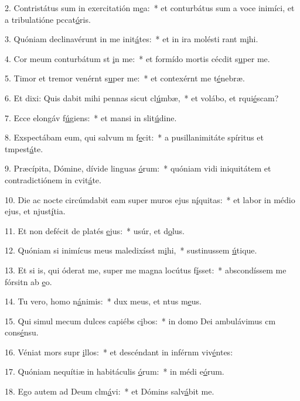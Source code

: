 2. Contristátus sum in exercitatión m\uline{e}a:~* et conturbátus sum a voce inimíci, et a tribulatióne pccat\uline{ó}ris.\par 
3. Quóniam declinavérunt in me init\uline{á}tes:~* et in ira molésti rant m\uline{i}hi.\par 
4. Cor meum conturbátum st \uline{i}n me:~* et formído mortis cécdit s\uline{u}per me.\par 
5. Timor et tremor venérnt s\uline{u}per me:~* et contexérnt me t\uline{é}nebræ.\par 
6. Et dixi: Quis dabit mihi pennas sicut cl\uline{ú}mbæ,~* et volábo, et rqui\uline{é}scam?\par 
7. Ecce elongáv f\uline{ú}giens:~* et mansi in slit\uline{ú}dine.\par 
8. Exspectábam eum, qui salvum m f\uline{e}cit:~* a pusillanimitáte spíritus et tmpest\uline{á}te.\par 
9. Præcípita, Dómine, dívide linguas \uline{ó}rum:~* quóniam vidi iniquitátem et contradictiónem in cvit\uline{á}te.\par 
10. Die ac nocte circúmdabit eam super muros ejus n\uline{í}quitas:~* et labor in médio ejus, et njust\uline{í}tia.\par 
11. Et non defécit de platés \uline{e}jus:~* usúr, et d\uline{o}lus.\par 
12. Quóniam si inimícus meus maledixísst m\uline{i}hi,~* sustinussem \uline{ú}tique.\par 
13. Et si is, qui óderat me, super me magna locútus f\uline{í}sset:~* abscondíssem me fórsitn ab \uline{e}o.\par 
14. Tu vero, homo n\uline{á}nimis:~* dux meus, et ntus m\uline{e}us.\par 
15. Qui simul mecum dulces capiébs c\uline{i}bos:~* in domo Dei ambulávimus cm cons\uline{é}nsu.\par 
16. Véniat mors supr \uline{i}llos:~* et descéndant in inférnm viv\uline{é}ntes:\par 
17. Quóniam nequítiæ in habitáculis \uline{ó}rum:~* in médi e\uline{ó}rum.\par 
18. Ego autem ad Deum clm\uline{á}vi:~* et Dómins salv\uline{á}bit me.\par 
